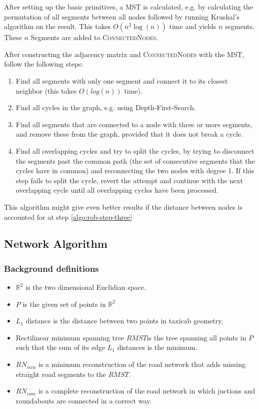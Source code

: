\documentclass[11pt]{article}
\begin{document}
After setting up the basic primitives, a MST is calculated, e.g. by calculating the permutation of all segments between all nodes followed by running Kruskal's algorithm \cite{k-osssgtsp-56} on the result. This takes $O(n^2\log(n))$ time and yields $n$ segments. These $n$ Segments are added to \textsc{ConnectedNodes}.

After constructing the adjacency matrix and \textsc{ConnectedNodes} with the MST, follow the following steps:

\begin{enumerate}
\item Find all segments with only one segment and connect it to its closest neighbor (this takes $O(log(n))$ time).

\item Find all cycles in the graph, e.g. using Depth-First-Search.

\item\label{algo:rob-step-three} Find all segments that are connected to a node with three or more segments, and remove these from the graph, provided that it does not break a cycle.

\item Find all overlapping cycles and try to split the cycles, by trying to disconnect the segments past the common path (the set of consecutive segments that the cycles have in common) and reconnecting the two nodes with degree 1. If this step fails to split the cycle, revert the attempt and continue with the next overlapping cycle until all overlapping cycles have been processed.

\end{enumerate}

This algorithm might give even better results if the distance between nodes is accounted for at step \ref{algo:rob-step-three}

\subsection{Network Algorithm}
\subsubsection{Background definitions}
\begin{itemize}
  \item $\mathbb{R}^2$ is the two dimensional Euclidian space.
  \item $P$ is the given set of points in $\mathbb{R}^2$
  \item $L_1$ distance is the distance between two points in taxicab geometry.
  \item Rectilinear minimum spanning tree $RMST$is the tree spanning all points in $P$ such that the sum of its edge $L_1$ distances is the minimum.
  \item $RN_{min}$ is a minimum reconstruction of the road network that adds missing straight road segments to the $RMST$.
  \item $RN_{com}$ is a complete reconstruction of the road network in which juctions and roundabouts are connected in a correct way.
\end{itemize}
\end{document}
